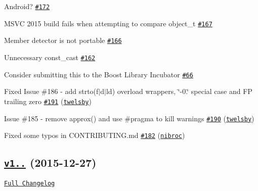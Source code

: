 \begin{DoxyItemize}
\item Android? \href{https://github.com/nlohmann/json/issues/172}{\tt \#172}
\item M\+S\+VC 2015 build fails when attempting to compare object\+\_\+t \href{https://github.com/nlohmann/json/issues/167}{\tt \#167}
\item Member detector is not portable \href{https://github.com/nlohmann/json/issues/166}{\tt \#166}
\item Unnecessary const\+\_\+cast \href{https://github.com/nlohmann/json/issues/162}{\tt \#162}
\item Consider submitting this to the Boost Library Incubator \href{https://github.com/nlohmann/json/issues/66}{\tt \#66}
\item Fixed Issue \#186 -\/ add strto(f$\vert$d$\vert$ld) overload wrappers, \char`\"{}-\/0.\char`\"{} special case and FP trailing zero \href{https://github.com/nlohmann/json/pull/191}{\tt \#191} (\href{https://github.com/twelsby}{\tt twelsby})
\item Issue \#185 -\/ remove approx() and use \#pragma to kill warnings \href{https://github.com/nlohmann/json/pull/190}{\tt \#190} (\href{https://github.com/twelsby}{\tt twelsby})
\item Fixed some typos in C\+O\+N\+T\+R\+I\+B\+U\+T\+I\+N\+G.\+md \href{https://github.com/nlohmann/json/pull/182}{\tt \#182} (\href{https://github.com/nibroc}{\tt nibroc})
\end{DoxyItemize}

\subsection*{\href{https://github.com/nlohmann/json/releases/tag/v1.0.0}{\tt v1..} (2015-\/12-\/27)}

\href{https://github.com/nlohmann/json/compare/v1.0.0-rc1...v1.0.0}{\tt Full Changelog}


